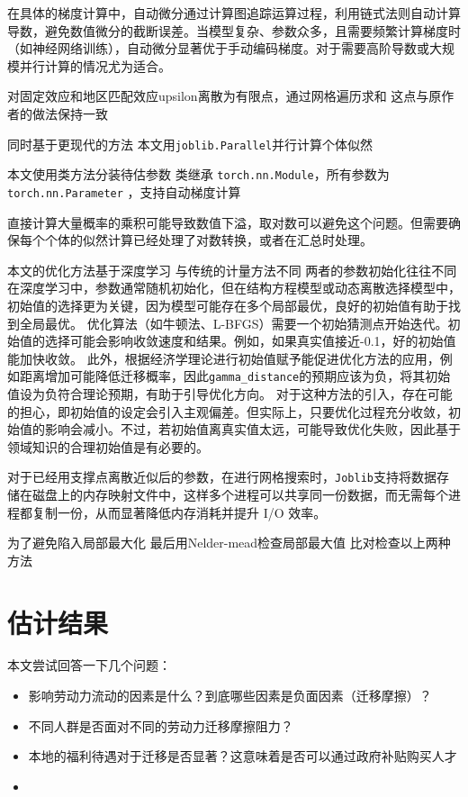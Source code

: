 \documentclass[a4paper,12pt,oneside]{book} %
\begin{document}
在具体的梯度计算中，自动微分通过计算图追踪运算过程，利用链式法则自动计算导数，避免数值微分的截断误差。当模型复杂、参数众多，且需要频繁计算梯度时（如神经网络训练），自动微分显著优于手动编码梯度。对于需要高阶导数或大规模并行计算的情况尤为适合。

对固定效应和地区匹配效应upsilon离散为有限点，通过网格遍历求和
这点与原作者的做法保持一致

同时基于更现代的方法
本文用\lstinline{joblib.Parallel}并行计算个体似然

本文使用类方法分装待估参数
类继承
\lstinline{torch.nn.Module}，所有参数为\lstinline{torch.nn.Parameter} ，支持自动梯度计算

直接计算大量概率的乘积可能导致数值下溢，取对数可以避免这个问题。但需要确保每个个体的似然计算已经处理了对数转换，或者在汇总时处理。

本文的优化方法基于深度学习
与传统的计量方法不同
两者的参数初始化往往不同
在深度学习中，参数通常随机初始化，但在结构方程模型或动态离散选择模型中，初始值的选择更为关键，因为模型可能存在多个局部最优，良好的初始值有助于找到全局最优。
优化算法（如牛顿法、L-BFGS）需要一个初始猜测点开始迭代。初始值的选择可能会影响收敛速度和结果。例如，如果真实值接近-0.1，好的初始值能加快收敛。
此外，根据经济学理论进行初始值赋予能促进优化方法的应用，例如距离增加可能降低迁移概率，因此\lstinline{gamma_distance}的预期应该为负，将其初始值设为负符合理论预期，有助于引导优化方向。
对于这种方法的引入，存在可能的担心，即初始值的设定会引入主观偏差。但实际上，只要优化过程充分收敛，初始值的影响会减小。不过，若初始值离真实值太远，可能导致优化失败，因此基于领域知识的合理初始值是有必要的。


对于已经用支撑点离散近似后的参数，在进行网格搜索时，\lstinline{Joblib}支持将数据存储在磁盘上的内存映射文件中，这样多个进程可以共享同一份数据，而无需每个进程都复制一份，从而显著降低内存消耗并提升 I/O 效率。

为了避免陷入局部最大化
最后用Nelder-mead检查局部最大值
比对检查以上两种方法




\chapter{估计结果}

本文尝试回答一下几个问题：
\begin{itemize}
  \item 影响劳动力流动的因素是什么？到底哪些因素是负面因素（迁移摩擦）？
  \item 不同人群是否面对不同的劳动力迁移摩擦阻力？
  \item 本地的福利待遇对于迁移是否显著？这意味着是否可以通过政府补贴购买人才
  \item 
\end{itemize}
\end{document}
